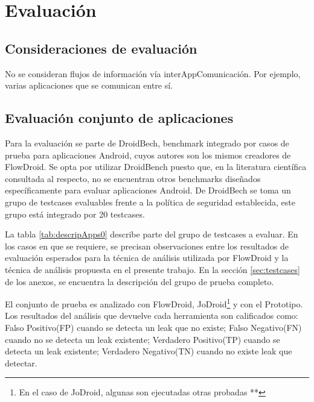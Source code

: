 \label{ch:evaluacion}
\chapter{Evaluación}

\section{Consideraciones de evaluación}
No se consideran flujos de información vía interAppComunicación. Por ejemplo,
varias aplicaciones que se comunican entre sí.

\section{Evaluación conjunto de aplicaciones}
Para la evaluación se parte de DroidBech, benchmark integrado por casos de
prueba para aplicaciones Android, cuyos autores son los mismos creadores de
FlowDroid. Se opta por utilizar DroidBench puesto que, en la literatura
científica consultada al respecto, no se encuentran otros benchmarks diseñados
específicamente para evaluar aplicaciones Android.\newline 
De DroidBech se toma un grupo de testcases evaluables frente a la política de
seguridad establecida, este grupo está integrado por 20 testcases.

La tabla \ref{tab:descripApps0} describe parte del grupo de testcases a
evaluar. En los casos en que se requiere, se precisan observaciones entre los
resultados de evaluación esperados para la técnica de análisis utilizada por
FlowDroid y la técnica de análisis propuesta en el presente trabajo. En
la sección \ref{sec:testcases} de los anexos, se encuentra la
descripción del grupo de prueba completo.

El conjunto de prueba es analizado con FlowDroid, JoDroid\footnote{En el caso de
JoDroid, algunas son ejecutadas otras probadas **} y con el Prototipo. Los
resultados del análisis que devuelve cada herramienta son calificados como:
Falso Positivo(FP) cuando se detecta un leak que no existe; Falso Negativo(FN)
cuando no se detecta un leak existente; Verdadero Positivo(TP) cuando se detecta
un leak existente; Verdadero Negativo(TN) cuando no existe leak que detectar.

